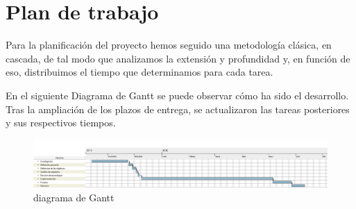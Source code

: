 \section{Plan de trabajo}
Para la planificación del proyecto hemos seguido una metodología clásica, en cascada, de tal modo que analizamos la extensión y profundidad y, en función de eso, distribuimos el tiempo que determinamos para cada tarea.\par
En el siguiente Diagrama de Gantt se puede observar cómo ha sido el desarrollo. Tras la ampliación de los plazos de entrega, se actualizaron las tareas posteriores y sus respectivos tiempos.\par
\begin{figure}[H]
    \centering
    \includegraphics[width=1\textwidth]{Images/diagramaGantt.png}
    \caption{diagrama de Gantt}
    \label{fig:diagramaGantt}
\end{figure}